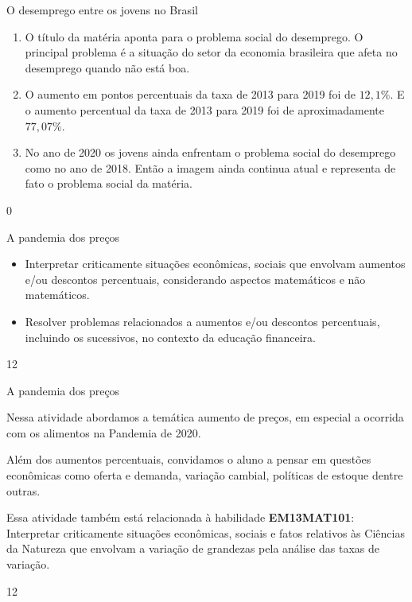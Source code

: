 \begin{answer}{O desemprego entre os jovens no Brasil}
{
\begin{enumerate}
\item O título da matéria aponta para o problema social do desemprego. O principal problema é a situação do setor da economia brasileira que afeta no desemprego quando não está boa.
\item  O aumento em pontos percentuais da taxa de 2013 para 2019 foi de $12{,}1\%$. E o aumento percentual da taxa de 2013 para 2019 foi de aproximadamente $77{,}07\%$.
\item No ano de 2020 os jovens ainda enfrentam o problema social do desemprego como no ano de 2018. Então a imagem ainda continua atual e representa de fato o problema social da matéria.  

\end{enumerate}
}{0}
\end{answer}
\begin{objectives}{A pandemia dos preços}
{
\begin{itemize}
\item Interpretar criticamente situações econômicas, sociais que envolvam aumentos e/ou descontos percentuais, considerando aspectos matemáticos e não matemáticos.
\item Resolver problemas relacionados a aumentos e/ou descontos percentuais, incluindo os sucessivos, no contexto da educação financeira.
\end{itemize}
}{1}{2}
\end{objectives}
\begin{sugestions}{A pandemia dos preços}
{
Nessa atividade abordamos a temática aumento de preços, em especial a ocorrida com os alimentos na Pandemia de 2020. 

Além dos aumentos percentuais, convidamos o aluno a pensar em questões econômicas como oferta e demanda, variação cambial, políticas de estoque dentre outras. 

Essa atividade também está relacionada à habilidade \textbf{EM13MAT101}: Interpretar criticamente situações econômicas, sociais e fatos relativos às Ciências da Natureza que envolvam a variação de grandezas pela análise das taxas de variação. 

}{1}{2}
\end{sugestions}
